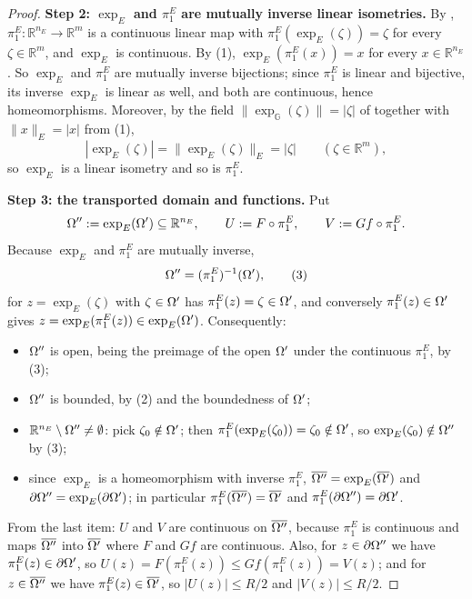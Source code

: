 \begin{proof}
\medskip\noindent\textbf{Step 2: $\exp_E$ and $\pi_1^E$ are mutually inverse linear
isometries.} By , $\pi_1^E:\mathbb R^{n_E}\to\mathbb R^{m}$ is a
continuous linear map with $\pi_1^E(\exp_E(\zeta))=\zeta$ for every $\zeta\in\mathbb R^{m}$,
and $\exp_E$ is continuous. By (1), $\exp_E(\pi_1^E(x))=x$ for every $x\in\mathbb R^{n_E}$.
So $\exp_E$ and $\pi_1^E$ are mutually inverse bijections; since $\pi_1^E$ is linear and
bijective, its inverse $\exp_E$ is linear as well, and both are continuous, hence
homeomorphisms. Moreover, by the field $\|\exp_{\mathbb G}(\zeta)\|=|\zeta|$ of
 together with $\|x\|_E=|x|$ from (1),
\[
 |\exp_E(\zeta)|=\|\exp_E(\zeta)\|_E=|\zeta|\qquad(\zeta\in\mathbb R^{m}), \tag{2}
\]
so $\exp_E$ is a linear isometry and so is $\pi_1^E$.

\medskip\noindent\textbf{Step 3: the transported domain and functions.} Put
\[
 \Omega'':=\exp_E(\Omega')\subseteq\mathbb R^{n_E},\qquad
 U:=F\circ\pi_1^E,\qquad V:=Gf\circ\pi_1^E .
\]
Because $\exp_E$ and $\pi_1^E$ are mutually inverse,
\[
 \Omega''=(\pi_1^E)^{-1}(\Omega') , \tag{3}
\]
for $z=\exp_E(\zeta)$ with $\zeta\in\Omega'$ has $\pi_1^E(z)=\zeta\in\Omega'$, and conversely
$\pi_1^E(z)\in\Omega'$ gives $z=\exp_E(\pi_1^E(z))\in\exp_E(\Omega')$. Consequently:
\begin{itemize}
\item $\Omega''$ is open, being the preimage of the open $\Omega'$ under the continuous $\pi_1^E$,
  by (3);
\item $\Omega''$ is bounded, by (2) and the boundedness of $\Omega'$;
\item $\mathbb R^{n_E}\setminus\Omega''\ne\emptyset$: pick $\zeta_0\notin\Omega'$; then
  $\pi_1^E(\exp_E(\zeta_0))=\zeta_0\notin\Omega'$, so $\exp_E(\zeta_0)\notin\Omega''$ by (3);
\item since $\exp_E$ is a homeomorphism with inverse $\pi_1^E$,
  $\overline{\Omega''}=\exp_E(\overline{\Omega'})$ and $\partial\Omega''=\exp_E(\partial\Omega')$; in particular
  $\pi_1^E(\overline{\Omega''})=\overline{\Omega'}$ and $\pi_1^E(\partial\Omega'')=\partial\Omega'$.
\end{itemize}

From the last item: $U$ and $V$ are continuous on $\overline{\Omega''}$, because $\pi_1^E$ is
continuous and maps $\overline{\Omega''}$ into $\overline{\Omega'}$ where $F$ and $Gf$ are
continuous. Also, for $z\in\partial\Omega''$ we have $\pi_1^E(z)\in\partial\Omega'$, so
$U(z)=F(\pi_1^E(z))\le Gf(\pi_1^E(z))=V(z)$; and for $z\in\overline{\Omega''}$ we have
$\pi_1^E(z)\in\overline{\Omega'}$, so $|U(z)|\le R/2$ and $|V(z)|\le R/2$.


\end{proof}
